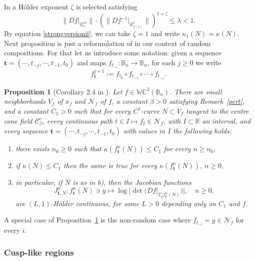 \documentclass[11pt,reqno]{amsart}
\theoremstyle{plain}
\newtheorem{proposition}[theorem]{Proposition}
\newtheorem*{theorem A}{Theorem A}
\newtheorem*{theorem B}{Theorem B}
\newtheorem*{theorem C}{Theorem C}
\newtheorem*{theorem 1}{Theorem 1}
\newtheorem*{theorem 2}{Theorem 2}
\newtheorem*{theorem 3}{Theorem 3}
\numberwithin{equation}{section}
\begin{document}
In \cite{alves2000srb} a H\"older exponent $\zeta$ is selected satisfying
$$
\|D f|_{E^{ss}_x}\| \cdot (\|D f^{-1}|_{E^{c}_{f(x)}}\|)^{1+\zeta} \leq \lambda<1.
$$
By equation \eqref{strongversionii}, we can take $\zeta=1$ and write $\kappa_1(N)= \kappa(N)$.
Next proposition is just a reformulation of \cite[Corollary 2.4]{alves2000srb} in our context of random compositions.
For that let us introduce some notation: given a sequence $\mathbf{t}=(\cdots, t_{-j}, \cdots, t_{-1}, t_0)$ and maps $f_{t_{-i}}\colon \mathbb{B}_n \to \mathbb{B}_n$, for each $j\ge 0$ we write
\begin{equation}
\label{e.compositionsoffs}
f^{j+1}_\mathbf{t} := f_{t_0}\circ f_{t_{-1}}\circ \cdots \circ f_{t_{-j}}.
\end{equation}
\begin{proposition}[Corollary 2.4 in \cite{alves2000srb}]\label{proj}
Let $f\in\mathbb{WC}^2 ( \mathbb{B}_n)$.
There are small neighborhoods $V_f$ of $x_f$ and $\mathcal{N}_f$ of $f$, a constant $\beta >0$ satisfying Remark~\ref{pert}, and a constant $C_1 > 0$ such that for every $C^1$-curve $N \subset V_f$ tangent to the centre cone field $\mathcal{C}_\beta ^{c}$, every continuous path $t \in I \mapsto f_t \in \mathcal{N}_f$, with $I \subset \mathbb{R}$ an interval, and every sequence $\mathbf{t}=(\cdots, t_{-j}, \cdots, t_{-1}, t_0)$ with values in $I$ the following holds:
\begin{enumerate}
\item [$a$)] there exists $n_0 \geq 0$ such that $\kappa(f_{\mathbf{t}}^{n}(N)) \leq C_1$ for every $n \geq n_0$,
\item [$b$)] if $\kappa(N)\leq C_1$ then the same is true for every $\kappa(f_{\mathbf{t}}^{n}(N))$, $n \geq 0$,
\item [$c$)] in particular, if $N$ is as in b), then the Jacobian functions
\begin{equation*}
J^n_{\mathbf{t},N} \colon f_{\mathbf{t}}^n(N) \ni y \mapsto \log |\det(D f |_{T_y f_{\mathbf{t}}^n(N)})|, \quad n \geq 0,
\end{equation*}
are $(L,1)$-H\"{o}lder continuous, for some $L > 0$ depending only on $C_1$ and $f$.
\end{enumerate}
\end{proposition}
A special case of Proposition~\ref{proj} is the non-random case where $f_{t_{-i}}=g\in \mathcal{N}_f$ for every $i$.

\subsubsection{Cusp-like regions}\label{cr}
\end{document}
